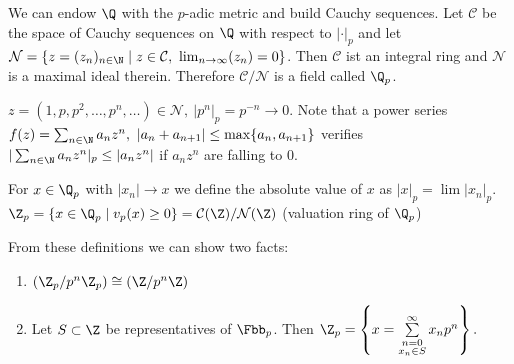 \documentclass{jvfscript}
\begin{document}
	We can endow $\Q$ with the $p$-adic metric and build Cauchy sequences. Let $\mathcal{C}$ be the space of Cauchy sequences on $\Q$ with respect to $|\cdot|_p$ and let $\mathcal{N} = \{z = (z_n)_{n \in \N} \mid z \in \mathcal{C},\ \lim_{n \to \infty}(z_n) = 0\}$. Then $\mathcal{C}$ ist an integral ring and $\mathcal{N}$ is a maximal ideal therein. Therefore $\mathcal{C}/\mathcal{N}$ is a field called $\Q_p$.
	
	\begin{exmp}
		$z = (1,p,p^2,\dotsc,p^n,\dotsc) \in \mathcal{N},\ |p^n|_p = p^{-n} \to 0$. Note that a power series $ f(z) = \sum_{n \in \N} a_n z^n,\ |a_n + a_{n+1}| \leq \max\{a_n,a_{n+1}\} $ verifies $ |\sum_{n \in \N} a_nz^n|_p \leq |a_nz^n| $ if $ a_nz^n $ are falling to 0.
	\end{exmp}

	\begin{defn}[Limits in $\Q_p$]
		For $ x \in \Q_p $ with $|x_n| \to x$ we define the absolute value of $x$ as $ |x|_p = \lim|x_n|_p $. \\
		$ \Z_p = \{x \in \Q_p \mid v_p(x) \geq 0\} = \mathcal{C}(\Z)/\mathcal{N}(\Z) $ (valuation ring of $\Q_p$)
	\end{defn}	
	From these definitions we can show two facts:
	\begin{enumerate}[label = {\roman*})]
		\item $ \left( \Z_p/p^n\Z_p \right) \cong \left( \Z/p^n\Z \right) $
		\item Let $ S \subset \Z $ be representatives of $ \Fbb_p $. Then $ \Z_p = \left\{ x = \sum\limits_{\substack{n=0\\x_n \in S}}^\infty x_n p^n \right\}. $ 
	\end{enumerate}
	
\end{document}
